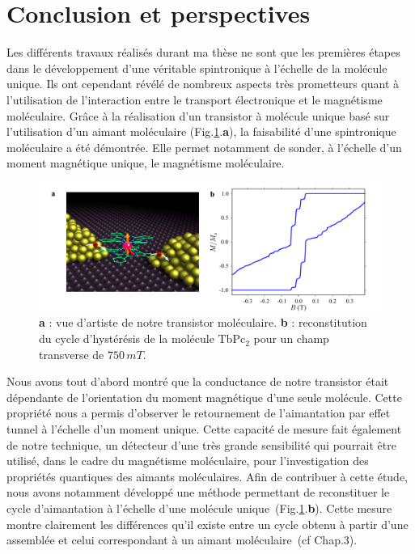\chapter*{Conclusion et perspectives}
\setcounter{figure}{0}
\renewcommand{\thefigure}{Concl.\arabic{figure}}

Les différents travaux réalisés durant ma thèse ne sont que les premières étapes dans le développement d'une véritable spintronique à l'échelle de la molécule unique. Ils ont cependant révélé de nombreux aspects très prometteurs quant à l'utilisation de l'interaction entre le transport électronique et le magnétisme moléculaire. Grâce à la réalisation d'un transistor à molécule unique basé sur l'utilisation d'un aimant moléculaire (Fig.\ref{Conclusion1}.\textbf{a}), la faisabilité d'une spintronique moléculaire a été démontrée. Elle permet notamment de sonder, à l'échelle d'un moment magnétique unique, le magnétisme moléculaire.


\begin{figure}
\centering \includegraphics[scale=0.45]{Conclusion/Conclusion1/Conclusion1.pdf} 
\caption{\textbf{a} : vue d'artiste de notre transistor moléculaire. \textbf{b} : reconstitution du cycle d'hystérésis de la molécule TbPc$_2$ pour un champ transverse de $750\,mT$.}
\label{Conclusion1}
\end{figure}


Nous avons tout d'abord montré que la conductance de notre transistor était dépendante de l'orientation du moment magnétique d'une seule molécule. Cette propriété nous a permis d'observer le retournement de l'aimantation par effet tunnel à l'échelle d'un moment unique. Cette capacité de mesure fait également de notre technique, un détecteur d'une très grande sensibilité qui pourrait être utilisé, dans le cadre du magnétisme moléculaire, pour l'investigation des propriétés quantiques des aimants moléculaires. Afin de contribuer à cette étude, nous avons notamment développé une méthode permettant de reconstituer le cycle d'aimantation à l'échelle d'une molécule unique~(Fig.\ref{Conclusion1}.\textbf{b}). Cette mesure montre clairement les différences qu'il existe entre un cycle obtenu à partir d'une assemblée et celui correspondant à un aimant moléculaire~(cf Chap.3).


